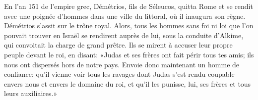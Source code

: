 En l’an 151 de l’empire grec,
	Démétrios, fils de Séleucos, quitta Rome
	et se rendit avec une poignée d’hommes dans une ville du littoral,
		où il inaugura son règne.
Démétrios s’assit sur le trône royal.
Alors, tous les hommes sans foi ni loi que l’on pouvait trouver en Israël
	se rendirent auprès de lui, sous la conduite d’Alkime,
	qui convoitait la charge de grand prêtre.
Ils se mirent à accuser leur propre peuple devant le roi, en disant:
	«Judas et ses frères ont fait périr tous tes amis;
	ils nous ont dispersés hors de notre pays.
Envoie donc maintenant un homme de confiance:
	qu’il vienne voir tous les ravages
		dont Judas s’est rendu coupable envers nous et envers le domaine du roi,
	et qu’il les punisse, lui, ses frères et tous leurs auxiliaires.»
